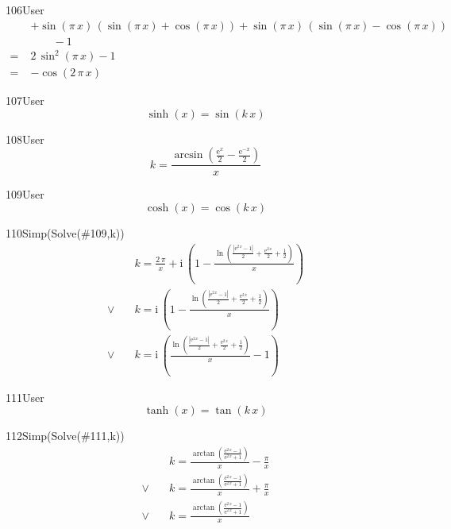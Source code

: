 \begin{espr}{106}{User}{\verificata}
\begin{align*}
& +\sin\!\left(\pi\, x\right)\, \left(\sin\!\left(\pi\, x\right) + \cos\!\left(\pi\, x\right)\right) + \sin\!\left(\pi\, x\right)\, \left(\sin\!\left(\pi\, x\right) - \cos\!\left(\pi\, x\right)\right) \\
&\qquad - 1 \\
=\;& 2\, \sin^{2}\!\left(\pi\, x\right) - 1 \\
=\;& -\cos\!\left(2\, \pi\, x\right)
\end{align*}
\end{espr}
\begin{espr}{107}{User}{}
\[
\sinh\!\left(x\right) = \sin\!\left(k\, x\right)
\]
\end{espr}
\begin{espr}{108}{User}{}
\[
k = \frac{\arcsin\!\left(\frac{\mathrm{e}^{x}}{2} - \frac{\mathrm{e}^{-x}}{2}\right)}{x}
\]
\end{espr}
\begin{espr}{109}{User}{}
\[
\cosh\!\left(x\right) = \cos\!\left(k\, x\right)
\]
\end{espr}
\begin{espr}{110}{Simp(Solve(\#109,k))}{}
\begin{align*}
& k = \frac{2\, \pi}{x} + \mathrm{i}\, \left(1 - \frac{\ln\!\left(\frac{\left|\mathrm{e}^{2\, x} - 1\right|}{2} + \frac{\mathrm{e}^{2\, x}}{2} + \frac{1}{2}\right)}{x}\right) \\[3pt]
\lor\quad & k = \mathrm{i}\, \left(1 - \frac{\ln\!\left(\frac{\left|\mathrm{e}^{2\, x} - 1\right|}{2} + \frac{\mathrm{e}^{2\, x}}{2} + \frac{1}{2}\right)}{x}\right) \\[3pt]
\lor\quad & k = \mathrm{i}\, \left(\frac{\ln\!\left(\frac{\left|\mathrm{e}^{2\, x} - 1\right|}{2} + \frac{\mathrm{e}^{2\, x}}{2} + \frac{1}{2}\right)}{x} - 1\right)
\end{align*}
\end{espr}
\begin{espr}{111}{User}{}
\[
\tanh\!\left(x\right) = \tan\!\left(k\, x\right)
\]
\end{espr}
\begin{espr}{112}{Simp(Solve(\#111,k))}{}
\begin{align*}
& k = \frac{\arctan\!\left(\frac{\mathrm{e}^{2\, x} - 1}{\mathrm{e}^{2\, x} + 1}\right)}{x} - \frac{\pi}{x} \\[3pt]
\lor\quad & k = \frac{\arctan\!\left(\frac{\mathrm{e}^{2\, x} - 1}{\mathrm{e}^{2\, x} + 1}\right)}{x} + \frac{\pi}{x} \\[3pt]
\lor\quad & k = \frac{\arctan\!\left(\frac{\mathrm{e}^{2\, x} - 1}{\mathrm{e}^{2\, x} + 1}\right)}{x}
\end{align*}
\end{espr}
